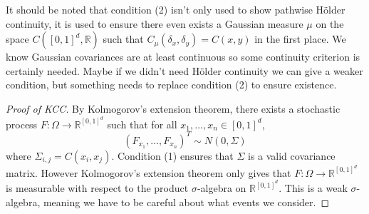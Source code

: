 \documentclass[fontsize=12pt, DIV=10]{scrreprt}
\theoremstyle{remark}
\newcommand{\R}{\mathbb R}
\newcommand{\boxspace}{\ensuremath{\R^{[0, 1]^d}}}
\begin{document}
It should be noted that condition (2) isn't only used to show pathwise H\"older continuity, it is used to ensure there even exists a Gaussian measure $\mu$ on  the space $C([0, 1]^d, \R)$ such that $C_{\mu}(\delta_x, \delta_y) = C(x, y)$ in the first place. We know Gaussian covariances are at least continuous so some continuity criterion is certainly needed. Maybe if we didn't need H\"older continuity we can give a weaker condition, but something needs to replace condition (2) to ensure existence.

\begin{proof}[Proof of KCC]
	By Kolmogorov's extension theorem, there exists a stochastic process $F: \Omega \to \boxspace$ such that for all $x_1, \ldots, x_n \in [0, 1]^d$, 
	\begin{equation}
		(F_{x_1}, \ldots, F_{x_n})^T
		\sim N(0, \Sigma)
	\end{equation}
	where $\Sigma_{i,j} = C(x_i, x_j)$. Condition (1) ensures that $\Sigma$ is a valid covariance matrix. However Kolmogorov's extension theorem only gives that $F: \Omega \to \boxspace$ is measurable with respect to the product $\sigma$-algebra on $\boxspace$. This is a weak $\sigma$-algebra, meaning we have to be careful about what events we consider.


\end{proof}
\end{document}
